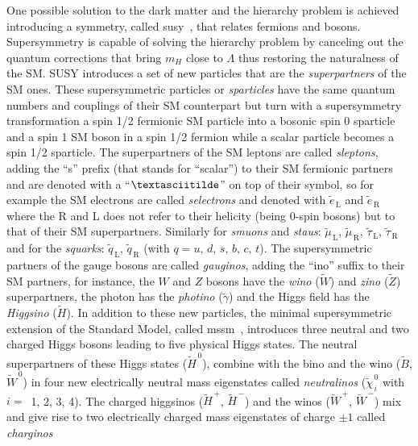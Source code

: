 One possible solution to the dark matter and the hierarchy problem is achieved
introducing a symmetry, called \gls{susy}~\cite{SUSYIntro}, that relates
fermions and bosons. Supersymmetry is capable of solving the hierarchy problem
by canceling out the quantum corrections that bring $m_H$ close to $\Lambda$
thus restoring the naturalness of the SM\@. SUSY introduces a set of new
particles that are the \emph{superpartners} of the SM ones. These supersymmetric
particles or \emph{sparticles} have the same quantum numbers and couplings of
their SM counterpart but turn with a supersymmetry transformation a spin 1/2
fermionic SM particle into a bosonic spin 0 sparticle and a spin 1 SM boson in a
spin 1/2 fermion while a scalar particle becomes a spin 1/2 sparticle. The
superpartners of the SM leptons are called \emph{sleptons}, adding the ``s''
prefix (that stands for ``scalar'') to their SM fermionic partners and are
denoted with a ``$\textasciitilde$'' on top of their symbol, so for example the
SM electrons are called \emph{selectrons} and denoted with
$\tilde{e}_\mathrm{\, L}$ and $\tilde{e}_\mathrm{\, R}$ where the R and L does
not refer to their helicity (being 0-spin bosons) but to that of their SM
superpartners. Similarly for \emph{smuons} and \emph{staus}:
$\tilde{\mu}_\mathrm{\, L}$, $\tilde{\mu}_\mathrm{\, R}$,
$\tilde{\tau}_\mathrm{\, L}$, $\tilde{\tau}_\mathrm{\, R}$ and for the
\emph{squarks}: $\tilde{q}_\mathrm{\, L}$, $\tilde{q}_\mathrm{\, R}$ (with
$q = u,\, d,\, s,\, b,\, c,\, t$). The supersymmetric partners of the gauge
bosons are called \emph{gauginos}, adding the ``ino'' suffix to their SM
partners, for instance, the $W$ and $Z$ bosons have the \emph{wino}
($\widetilde{W}$) and \emph{zino} ($\widetilde{Z}$) superpartners, the photon
has the \emph{photino} ($\widetilde{\gamma}$) and the Higgs field has the
\emph{Higgsino} ($\widetilde{H}$). In addition to these new particles, the
minimal supersymmetric extension of the Standard Model, called
\gls{mssm}~\cite{MSSMIntro}, introduces three neutral and two charged Higgs
bosons leading to five physical Higgs states. The neutral superpartners of these
Higgs states ($\widetilde{H}^{\, 0}$), combine with the bino and the wino
($\widetilde{B}$, $\widetilde{W}^{\, 0}$) in four new electrically neutral mass
eigenstates called \emph{neutralinos} ($\widetilde{\chi}^{\, 0}_{\, i}$ with
$i = $~1, 2, 3, 4). The charged higgsinos ($\widetilde{H}^{\, +}$,
$\widetilde{H}^{\, -}$) and the winos ($\widetilde{W}^{\, +}$,
$\widetilde{W}^{\, -}$) mix and give rise to two electrically charged mass
eigenstates of charge $\pm 1$ called \emph{charginos}
